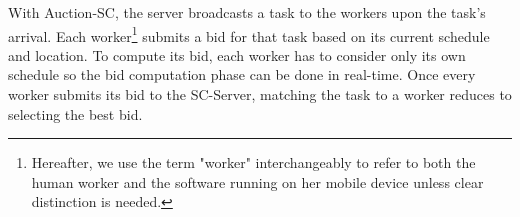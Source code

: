 With Auction-SC, the server broadcasts a task to the workers upon the task's arrival. Each worker\footnote{Hereafter, we use the term "worker" interchangeably to refer to both the human worker and the software running on her mobile device unless clear distinction is needed.} submits a bid for that task based on its current schedule and location. To compute its bid, each worker has to consider only its own schedule so the bid computation phase can be done in real-time. Once every worker submits its bid to the SC-Server, matching the task to a worker reduces to selecting the best bid.




